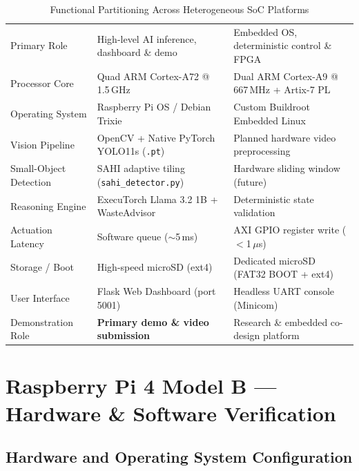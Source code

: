 \documentclass[12pt,a4paper]{article}
\begin{document}
\renewcommand{\arraystretch}{1.30}
\begin{table}[H]
\centering
\caption{Functional Partitioning Across Heterogeneous SoC Platforms}
\label{tab:hw_partition}
\small
\begin{tabularx}{\linewidth}{@{} L{3.5cm} X X @{}}
\toprule
{}
  & 
  &  \\
\midrule
{}
Primary Role
  & High-level AI inference, dashboard \& demo
  & Embedded OS, deterministic control \& FPGA \\
Processor Core
  & Quad ARM Cortex-A72 @ 1.5\,GHz
  & Dual ARM Cortex-A9 @ 667\,MHz + Artix-7 PL \\
Operating System
  & Raspberry Pi OS / Debian Trixie
  & Custom Buildroot Embedded Linux \\
Vision Pipeline
  & OpenCV + Native PyTorch YOLO11s (\texttt{.pt})
  & Planned hardware video preprocessing \\
Small-Object Detection
  & SAHI adaptive tiling (\texttt{sahi\_detector.py})
  & Hardware sliding window (future) \\
Reasoning Engine
  & ExecuTorch Llama 3.2 1B + WasteAdvisor
  & Deterministic state validation \\
Actuation Latency
  & Software queue ($\sim$5\,ms)
  & AXI GPIO register write ($<$1\,$\mu$s) \\
Storage / Boot
  & High-speed microSD (ext4)
  & Dedicated microSD (FAT32 BOOT + ext4) \\
User Interface
  & Flask Web Dashboard (port 5001)
  & Headless UART console (Minicom) \\
Demonstration Role
  & \textbf{Primary demo \& video submission}
  & Research \& embedded co-design platform \\
\bottomrule
\end{tabularx}
\end{table}

\clearpage

\section{Raspberry Pi 4 Model B --- Hardware \& Software Verification}

\subsection{Hardware and Operating System Configuration}
\end{document}
